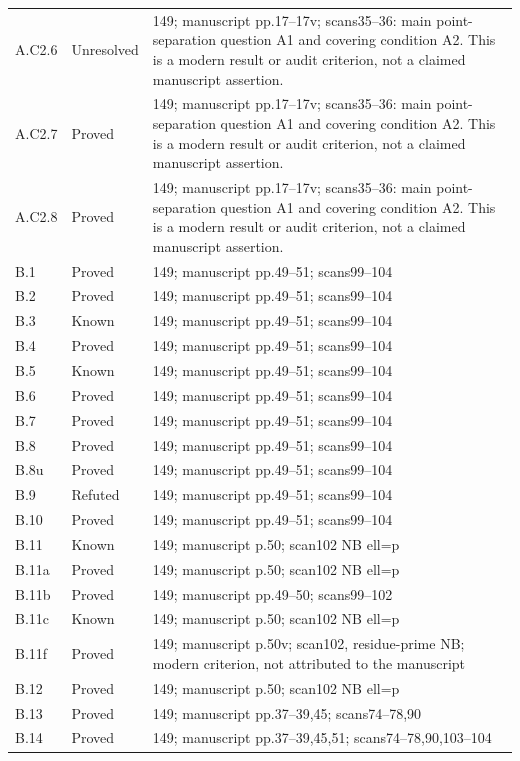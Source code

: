 {\begin{longtable}{p{1.9cm}p{1.7cm}p{10.3cm}}
A.C2.6 & Unresolved & 149; manuscript pp.17–17v; scans35–36: main point-separation question A1 and covering condition A2. This is a modern result or audit criterion, not a claimed manuscript assertion. \\
A.C2.7 & Proved & 149; manuscript pp.17–17v; scans35–36: main point-separation question A1 and covering condition A2. This is a modern result or audit criterion, not a claimed manuscript assertion. \\
A.C2.8 & Proved & 149; manuscript pp.17–17v; scans35–36: main point-separation question A1 and covering condition A2. This is a modern result or audit criterion, not a claimed manuscript assertion. \\
B.1 & Proved & 149; manuscript pp.49–51; scans99–104 \\
B.2 & Proved & 149; manuscript pp.49–51; scans99–104 \\
B.3 & Known & 149; manuscript pp.49–51; scans99–104 \\
B.4 & Proved & 149; manuscript pp.49–51; scans99–104 \\
B.5 & Known & 149; manuscript pp.49–51; scans99–104 \\
B.6 & Proved & 149; manuscript pp.49–51; scans99–104 \\
B.7 & Proved & 149; manuscript pp.49–51; scans99–104 \\
B.8 & Proved & 149; manuscript pp.49–51; scans99–104 \\
B.8u & Proved & 149; manuscript pp.49–51; scans99–104 \\
B.9 & Refuted & 149; manuscript pp.49–51; scans99–104 \\
B.10 & Proved & 149; manuscript pp.49–51; scans99–104 \\
B.11 & Known & 149; manuscript p.50; scan102 NB ell=p \\
B.11a & Proved & 149; manuscript p.50; scan102 NB ell=p \\
B.11b & Proved & 149; manuscript pp.49–50; scans99–102 \\
B.11c & Known & 149; manuscript p.50; scan102 NB ell=p \\
B.11f & Proved & 149; manuscript p.50v; scan102, residue-prime NB; modern criterion, not attributed to the manuscript \\
B.12 & Proved & 149; manuscript p.50; scan102 NB ell=p \\
B.13 & Proved & 149; manuscript pp.37–39,45; scans74–78,90 \\
B.14 & Proved & 149; manuscript pp.37–39,45,51; scans74–78,90,103–104 \\

\end{longtable}}

